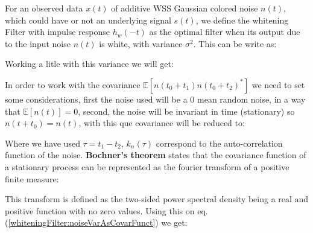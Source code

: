 \newp For an observed data $x(t)$ of additive WSS Gaussian colored noise $n(t)$, which could have or not an underlying signal $s(t)$, we define the whitening Filter with impulse response $h_w(-t)$ as the optimal filter when its output due to the input noise $n(t)$ is white, with variance $\sigma^{2}$. This can be write as:


\newp Working a litle with this variance we will get:


\newp In order to work with the covariance $\mathbb{E}[n(t_0 + t_1) n(t_0 + t_2)^{*}]$ we need to set some considerations, first the noise used will be a 0 mean random noise, in a way that $\mathbb{E}[n(t)] = 0$, second, the noise will be invariant in time (stationary) so $n(t + t_0) = n(t)$, with this que covariance will be reduced to:


\newp Where we have used $\tau = t_1 - t_2$, $k_n(\tau)$ correspond to the auto-correlation function of the noise. \textbf{Bochner's theorem} states that the covariance function of a stationary process can be represented as the fourier transform of a positive finite measure\cite{gauss-procss}:


\newp This transform is defined as the two-sided power spectral density being a real and positive function with no zero values. Using this on eq. (\ref{whiteningFilter:noiseVarAsCovarFunct}) we get:

